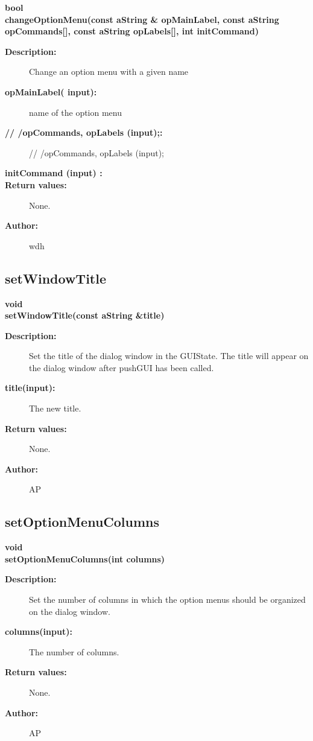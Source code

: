 \begin{flushleft} \textbf{%
bool  \\ 
\settowidth{\DialogDataIncludeArgIndent}{changeOptionMenu(}%
changeOptionMenu(const aString \& opMainLabel, const aString opCommands[], const aString opLabels[], int initCommand)
}\end{flushleft}
\begin{description}
\item[{\bf Description:}]  
    Change an option menu with a given name

\item[{\bf opMainLabel( input):}]  name of the option menu
\item[{\bf // /opCommands, opLabels (input);:}] // /opCommands, opLabels (input);
\item[{\bf initCommand (input) :}]  

\item[{\bf Return values:}]  None.
\item[{\bf Author:}]  wdh
\end{description}
\subsection{setWindowTitle}
 
\begin{flushleft} \textbf{%
void  \\ 
\settowidth{\DialogDataIncludeArgIndent}{setWindowTitle(}%
setWindowTitle(const aString \&title)
}\end{flushleft}
\begin{description}
\item[{\bf Description:}]  Set the title of the dialog window in the GUIState. The title
 will appear on the dialog window after pushGUI has been called.

\item[{\bf title(input):}]  The new title.

\item[{\bf Return values:}]  None.
\item[{\bf Author:}]  AP
\end{description}
\subsection{setOptionMenuColumns}
 
\begin{flushleft} \textbf{%
void  \\ 
\settowidth{\DialogDataIncludeArgIndent}{setOptionMenuColumns(}%
setOptionMenuColumns(int columns)
}\end{flushleft}
\begin{description}
\item[{\bf Description:}]  Set the number of columns in which the option menus should 
 be organized on the dialog window.
\item[{\bf columns(input):}]  The number of columns.
\item[{\bf Return values:}]  None.
\item[{\bf Author:}]  AP
\end{description}
